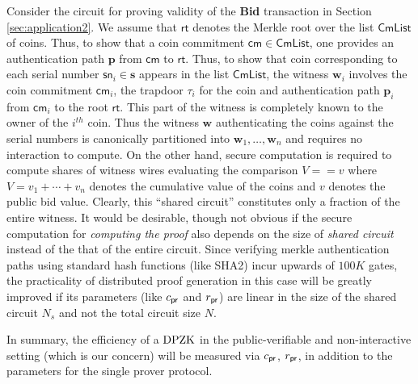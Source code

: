{\color{blue}
Consider the circuit for proving validity of the {\bf Bid} transaction in Section \ref{sec:application2}. We assume that $\mathsf{rt}$ denotes the Merkle
 root over the list $\mathsf{CmList}$ of coins. Thus, to show that a coin commitment $\mathsf{cm}\in \mathsf{CmList}$, one provides an authentication path 
 $\bm{p}$ from $\mathsf{cm}$ to $\mathsf{rt}$. Thus, to show that coin corresponding to each serial number
$\mathsf{sn}_i\in \bm{s}$ appears in the list $\mathsf{CmList}$, the witness $\bm{w}_i$ involves the coin commitment $\mathsf{cm}_i$, the trapdoor $\tau_i$ for the coin 
and authentication path $\bm{p}_i$ from $\mathsf{cm}_i$ to the root $\mathsf{rt}$. This part of the witness is completely known to the owner of 
the $i^{th}$ coin. Thus the witness $\bm{w}$ authenticating the coins against the serial numbers is canonically partitioned into $\bm{w}_1,\ldots,\bm{w}_n$
and requires no interaction to compute. On the other hand, secure computation is required to compute shares of witness wires evaluating the comparison
$V==v$ where $V=v_1+\cdots+v_n$ denotes the cumulative value of the coins and $v$ denotes the public bid value. Clearly, this ``shared circuit'' 
constitutes only a fraction of the entire witness. It would be desirable, though not obvious if the secure computation for {\em computing the proof} 
also depends on the size of {\em shared circuit} instead of the that of the entire circuit. Since verifying merkle authentication paths using 
standard hash functions (like SHA2) incur upwards of $100K$ gates, the practicality of distributed proof generation in this case will be
greatly improved if its parameters (like $c_\mathsf{pr}$ and $r_\mathsf{pr}$) are 
linear in the size of the shared circuit $N_s$ and not the total circuit size $N$.
}

In summary, the efficiency of a $\text{DPZK}$ in the public-verifiable and
non-interactive setting (which is our concern) will be measured via $c_\mathsf{pr}$,
$r_\mathsf{pr}$, in addition to the parameters for the single prover protocol.

